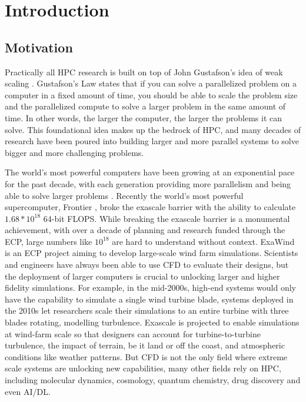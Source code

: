 
\glsresetall %
\chapter[Introduction]{Introduction}\label{ch:CH1-Introduction}


\section{Motivation}
Practically all \gls{HPC} research is built on top of John Gustafson's idea of weak scaling \cite{Gustafson1988GustafsonLaw}.
Gustafson's Law states that if you can solve a parallelized problem on a computer in a fixed amount of time, you should be able to scale the problem size and the parallelized compute to solve a larger problem in the same amount of time.
In other words, the larger the computer, the larger the problems it can solve.
This foundational idea makes up the bedrock of \gls{HPC}, and many decades of research have been poured into building larger and more parallel systems to solve bigger and more challenging problems.

The world's most powerful computers have been growing at an exponential pace for the past decade, with each generation providing more parallelism and being able to solve larger problems \cite{Top500}.
Recently the world's most powerful supercomputer, Frontier \cite{Frontier}, broke the exascale barrier with the ability to calculate $1.68*10^{18}$ 64-bit \gls{FLOPS}.
While breaking the exascale barrier is a monumental achievement, with over a decade of planning and research funded through the \gls{ECP}, large numbers like $10^{18}$ are hard to understand without context.
ExaWind \cite{ExaWind} is an \gls{ECP} project aiming to develop large-scale wind farm simulations.
Scientists and engineers have always been able to use \gls{CFD} to evaluate their designs, but the deployment of larger computers is crucial to unlocking larger and higher fidelity simulations.
For example, in the mid-2000s, high-end systems would only have the capability to simulate a single wind turbine blade, systems deployed in the 2010s let researchers scale their simulations to an entire turbine with three blades rotating, modelling turbulence.
Exascale is projected to enable simulations at wind-farm scale so that designers can account for turbine-to-turbine turbulence, the impact of terrain, be it land or off the coast, and atmospheric conditions like weather patterns.
But \gls{CFD} is not the only field where extreme scale systems are unlocking new capabilities, many other fields rely on \gls{HPC}, including molecular dynamics, cosmology, quantum chemistry, drug discovery and even \gls{AI}/\gls{DL}. 

